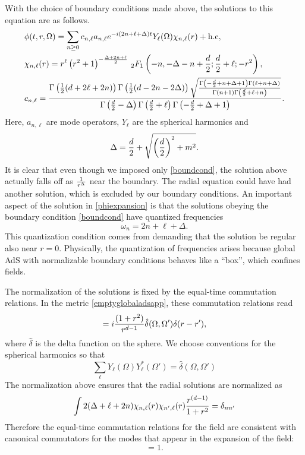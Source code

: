 \documentclass[12pt]{article}
\newcommand{\be}{\begin{equation}}
\newcommand{\ee}{\end{equation}}
\begin{document}
With the choice of boundary conditions made above, the solutions to this equation are as follows. 
\be
\label{phiexpansion}
\begin{split}
&\phi(t, r, \Omega) = \sum_{n \geq 0} c_{n, \ell} a_{n, \ell} e^{-i (2 n + \ell + \Delta) t} Y_{\ell}(\Omega) \chi_{n, \ell}(r) + \text{h.c}, \\
&\chi_{n, \ell}(r) = r^\ell \left(r^2+1\right)^{-{\Delta +2n + \ell \over 2}} \, _2F_1\left(-n, - \Delta -n+{d\over 2} ;\frac{d}{2}+\ell;-r^2\right), \\
&c_{n, \ell} = \frac{\Gamma \left(\frac{1}{2} (d+2 \ell+2 n)\right) \Gamma \left(\frac{1}{2} (d-2 n-2 \Delta )\right) \sqrt{\frac{\Gamma \left(-\frac{d}{2}+n+\Delta +1\right) \Gamma (\ell+n+\Delta )}{\Gamma (n+1) \Gamma \left(\frac{d}{2}+\ell+n\right)}}}{\Gamma \left(\frac{d}{2}-\Delta \right) \Gamma \left(\frac{d}{2}+\ell\right) \Gamma
   \left(-\frac{d}{2}+\Delta +1\right)}.
\end{split}
\ee
Here, $a_{n, \ell}$ are mode operators, $Y_{\ell}$ are the spherical harmonics and 
\be
\Delta = {d \over 2} + \sqrt{\left({d \over 2}\right)^2 + m^2}.
\ee
It is clear that even though we imposed only \eqref{boundcond}, the solution above actually falls off as ${1 \over r^{\Delta}}$ near the boundary. The radial equation could have had another solution, which is excluded by our boundary conditions. An important aspect of the solution in \eqref{phiexpansion} is that the solutions obeying the boundary condition \eqref{boundcond} have quantized frequencies
\be
\omega_n = 2 n + \ell + \Delta.
\ee
This quantization condition comes from demanding that the solution be regular also near $r = 0$. Physically, the quantization of frequencies arises because global AdS with normalizable boundary conditions behaves like a ``box'',
which confines fields.

The normalization of the solutions is fixed by the equal-time commutation relations. In the metric \eqref{emptyglobaladsapp}, these commutation relations read
\be
[\phi(t, r, \Omega), {d \over d t} \phi(t, r', \Omega')] =  i {(1 + r^2) \over r^{d-1}} \hat{\delta}(\Omega, \Omega') \delta(r - r'), 
\ee
where $\hat{\delta}$ is the delta function on the sphere. We choose conventions for the spherical harmonics so that
\be
\sum_{\ell} Y_{\ell}(\Omega) Y^*_{\ell}(\Omega') = \hat{\delta}(\Omega, \Omega')
\ee
The normalization above ensures that the radial solutions are normalized as
\be
\int 2(\Delta + \ell + 2 n) \chi_{n, \ell}(r) \chi_{n', \ell}(r) {r^{(d-1)} \over 1 + r^2} = \delta_{n n'}
\ee
Therefore the equal-time commutation relations for the field are consistent
with canonical commutators for the modes that appear in the expansion of the field:
\be
[a_{n, \ell}, a_{n, \ell}^{\dagger}] = 1.
\ee
\end{document}
